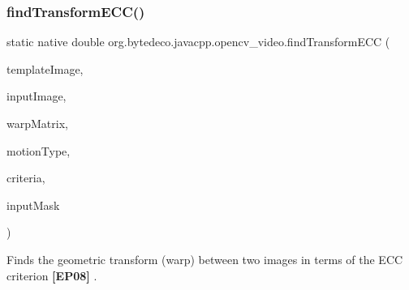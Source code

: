 \subsubsection{\texorpdfstring{find\+Transform\+E\+C\+C()}{findTransformECC()}}
{\footnotesize\ttfamily static native double org.\+bytedeco.\+javacpp.\+opencv\+\_\+video.\+find\+Transform\+E\+CC (\begin{DoxyParamCaption}\item[{@By\+Val Mat}]{template\+Image,  }\item[{@By\+Val Mat}]{input\+Image,  }\item[{@By\+Val Mat}]{warp\+Matrix,  }\item[{int}]{motion\+Type,  }\item[{@By\+Val(null\+Value=\char`\"{}cv\+::\+Term\+Criteria(cv\+::\+Term\+Criteria\+::\+C\+O\+U\+NT+cv\+::\+Term\+Criteria\+::\+E\+PS, 50, 0.\+001)\char`\"{}) Term\+Criteria}]{criteria,  }\item[{@By\+Val(null\+Value=\char`\"{}cv\+::\+Input\+Array(cv\+::no\+Array())\char`\"{}) Mat}]{input\+Mask }\end{DoxyParamCaption})\hspace{0.3cm}{\ttfamily [static]}}



Finds the geometric transform (warp) between two images in terms of the E\+CC criterion {\bfseries [E\+P08]} . 


